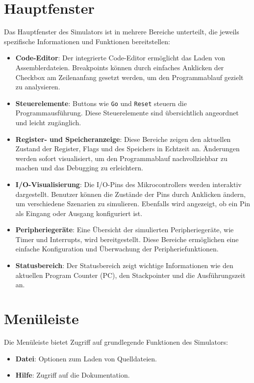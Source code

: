 \section{Hauptfenster}
Das Hauptfenster des Simulators ist in mehrere Bereiche unterteilt, die jeweils spezifische Informationen und Funktionen bereitstellen:
\begin{itemize}
    \item \textbf{Code-Editor}: Der integrierte Code-Editor ermöglicht das Laden von Assemblerdateien. Breakpoints können durch einfaches Anklicken der Checkbox am Zeilenanfang gesetzt werden, um den Programmablauf gezielt zu analysieren.
    \item \textbf{Steuerelemente}: Buttons wie \texttt{Go} und \texttt{Reset} steuern die Programmausführung. Diese Steuerelemente sind übersichtlich angeordnet und leicht zugänglich.
    \item \textbf{Register- und Speicheranzeige}: Diese Bereiche zeigen den aktuellen Zustand der Register, Flags und des Speichers in Echtzeit an. Änderungen werden sofort visualisiert, um den Programmablauf nachvollziehbar zu machen und das Debugging zu erleichtern.
    \item \textbf{I/O-Visualisierung}: Die I/O-Pins des Mikrocontrollers werden interaktiv dargestellt. Benutzer können die Zustände der Pins durch Anklicken ändern, um verschiedene Szenarien zu simulieren. Ebenfalls wird angezeigt, ob ein Pin als Eingang oder Ausgang konfiguriert ist.
    \item \textbf{Peripheriegeräte}: Eine Übersicht der simulierten Peripheriegeräte, wie Timer und Interrupts, wird bereitgestellt. Diese Bereiche ermöglichen eine einfache Konfiguration und Überwachung der Peripheriefunktionen.
    \item \textbf{Statusbereich}: Der Statusbereich zeigt wichtige Informationen wie den aktuellen Program Counter (PC), den Stackpointer und die Ausführungszeit an.
\end{itemize}

\section{Menüleiste}
Die Menüleiste bietet Zugriff auf grundlegende Funktionen des Simulators:
\begin{itemize}
    \item \textbf{Datei}: Optionen zum Laden von Quelldateien.
    \item \textbf{Hilfe}: Zugriff auf die Dokumentation.
\end{itemize}

